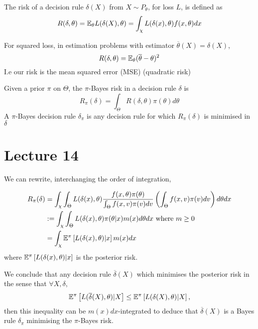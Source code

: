 \documentclass[a4paper]{article}
\begin{document}
\begin{defn}
	The risk of a decision rule $\delta(X)$ from $X \sim P_{\theta}$, for loss $L$, is defined as 
	\[
		R(\delta, \theta) = \mathbb{E}_{\theta} L(\delta(X),\theta) = \int_{\chi} L(\delta(x),\theta) f(x,\theta)dx
	\] 
\end{defn}

\begin{eg}
	For squared loss, in estimation problems with estimator $\overline{\theta}(X) = \delta(X)$,
	\[
		R(\delta,\theta) = \mathbb{E}_{\theta} (\overline{\theta} - \theta)^2
	\]
	I.e our risk is the mean squared error (MSE) (quadratic risk)
\end{eg}

\begin{defn}
	Given a prior $\pi$ on $\Theta$, the $\pi$-Bayes risk in a decision rule $\delta$ is 
	\[
		R_{\pi}(\delta) = \int_{\Theta} R(\delta, \theta) \pi(\theta) d\theta
	\]
	A $\pi$-Bayes decision rule $\delta_{\pi}$ is any decision rule for which $R_{\pi}(\delta)$ is minimised in $\delta$
\end{defn}

\newpage

\section*{Lecture 14}

We can rewrite, interchanging the order of integration,

\begin{align*}
	R_{\pi}(\delta) &= \int_{\chi} \int_{\Theta} L(\delta(x), \theta) \frac{f(x, \theta) \pi(\theta)}{\int_{\Theta} f(x, v) \pi(v) dv} \left( \int_{\Theta} f(x, v) \pi(v) dv \right) d\theta dx \\
	&:= \int_{\chi} \int_{\Theta} L(\delta(x), \theta) \pi(\theta |x) m(x) d\theta dx \text{ where } m\ge 0 \\
	&= \int_{\chi} \mathbb{E}^{\pi}\left[ L(\delta(x), \theta)  | x \right] m(x) dx \\
\end{align*}
where $\mathbb{E}^{\pi}\left[ L(\delta(x), \theta)  | x \right]$ is the posterior risk.

We conclude that any decision rule $\overline{\delta}(X)$ which minimises the posterior risk in the sense that $\forall X, \delta$,
\[
	\mathbb{E}^{\pi}\left[ L(\overline{\delta}(X), \theta)  | X \right] \le \mathbb{E}^{\pi}\left[ L(\delta(X), \theta)  | X \right]
,\]
then this inequality can be $m(x)dx$-integrated to deduce that $\overline{\delta}(X)$ is a Bayes rule $\delta_{\pi}$ minimising the $\pi$-Bayes risk.
\end{document}
